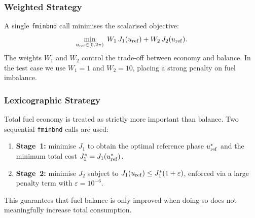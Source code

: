\subsubsection{Weighted Strategy}

A single \texttt{fminbnd} call minimises the scalarised objective:
\begin{equation}
  \min_{u_\mathrm{ref} \in [0,2\pi)}\; W_1\,J_1(u_\mathrm{ref}) + W_2\,J_2(u_\mathrm{ref}).
  \label{eq:weighted}
\end{equation}
The weights $W_1$ and $W_2$ control the trade-off between economy and
balance. In the test case we use $W_1 = 1$ and $W_2 = 10$, placing
a strong penalty on fuel imbalance.

\subsubsection{Lexicographic Strategy}

Total fuel economy is treated as strictly more important than balance.
Two sequential \texttt{fminbnd} calls are used:
\begin{enumerate}
  \item \textbf{Stage~1:} minimise $J_1$ to obtain the optimal reference
        phase $u_\mathrm{ref}^*$ and the minimum total cost $J_1^* = J_1(u_\mathrm{ref}^*)$.
  \item \textbf{Stage~2:} minimise $J_2$ subject to
        $J_1(u_\mathrm{ref}) \le J_1^*(1 + \varepsilon)$, enforced via a large
        penalty term with $\varepsilon = 10^{-6}$.
\end{enumerate}
This guarantees that fuel balance is only improved when doing so does
not meaningfully increase total consumption.
